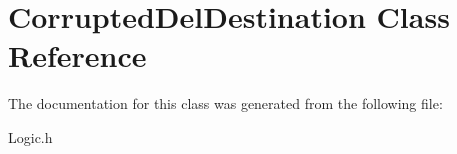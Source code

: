 \hypertarget{class_corrupted_del_destination}{\section{Corrupted\+Del\+Destination Class Reference}
\label{class_corrupted_del_destination}
}


The documentation for this class was generated from the following file\+:\begin{DoxyCompactItemize}
\item 
Logic.\+h\end{DoxyCompactItemize}
